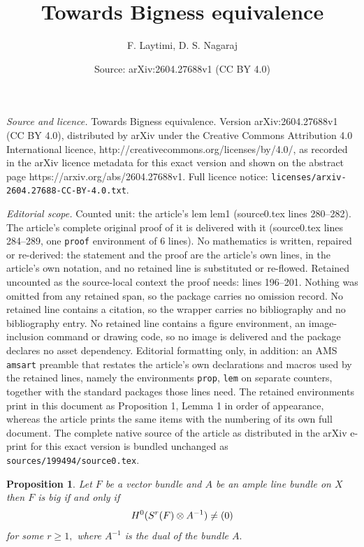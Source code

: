 \documentclass[10pt,a4paper]{amsart}
\title{Towards Bigness equivalence}
\author{F. Laytimi, D. S. Nagaraj}
\date{Source: arXiv:2604.27688v1 (CC BY 4.0)}
\newtheorem{prop}{Proposition}
\begin{document}
\maketitle

\noindent\emph{Source and licence.} Towards Bigness equivalence. Version arXiv:2604.27688v1 (CC BY 4.0), distributed by arXiv under the Creative Commons Attribution 4.0 International licence, http://creativecommons.org/licenses/by/4.0/, as recorded in the arXiv licence metadata for this exact version and shown on the abstract page https://arxiv.org/abs/2604.27688v1. Full licence notice: \texttt{licenses/arxiv-2604.27688-CC-BY-4.0.txt}.\par\smallskip

\noindent\textit{Editorial scope.} Counted unit: the article's lem lem1 (source0.tex lines 280--282). The article's complete original proof of it is delivered with it (source0.tex lines 284--289, one \texttt{proof} environment of 6 lines). No mathematics is written, repaired or re-derived: the statement and the proof are the article's own lines, in the article's own notation, and no retained line is substituted or re-flowed.  Retained uncounted as the source-local context the proof needs: lines 196--201.  Nothing was omitted from any retained span, so the package carries no omission record.  No retained line contains a citation, so the wrapper carries no bibliography and no bibliography entry.  No retained line contains a figure environment, an image-inclusion command or drawing code, so no image is delivered and the package declares no asset dependency.  Editorial formatting only, in addition: an AMS \texttt{amsart} preamble that restates the article's own declarations and macros used by the retained lines, namely the environments \texttt{prop}, \texttt{lem} on separate counters, together with the standard packages those lines need.  The retained environments print in this document as Proposition 1, Lemma 1 in order of appearance, whereas the article prints the same items with the numbering of its own full document.  The complete native source of the article as distributed in the arXiv e-print for this exact version is bundled unchanged as \texttt{sources/199494/source0.tex}.
\begin{prop}\label{prop2} Let $F$ be a vector bundle and $A$ be an ample line bundle  on $X$ then $F$ is big if and only if 
	$$ {\rm H}^{0}(S^r(F)\otimes A^{-1})\neq (0)$$ 
	for some $r \geq 1,$
	where  $A^{-1}$
	is the dual of the bundle $A.$
\end{prop}
\end{document}
